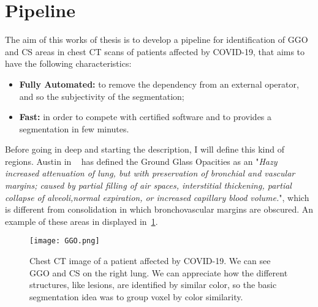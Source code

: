 
	
	\section{Pipeline}
	
	
	
	The aim of this works of thesis is to develop a pipeline for identification of GGO and CS areas in chest CT scans of patients affected by COVID-19, that aims to have the following characteristics:   
	\begin{itemize}
		\item  \textbf{Fully Automated: } to remove the dependency from an external operator, and so the subjectivity of the segmentation; 
		
		\item \textbf{Fast: } in order to compete with certified software and to provides a segmentation in few minutes.
	\end{itemize}

	Before going in deep and starting the description, I will define this kind of regions. 	
	Austin in ~\cite{ART:Austin} has defined the Ground Glass Opacities as an "\emph{Hazy increased attenuation of lung, but with preservation of bronchial and vascular margins; caused by partial filling of air spaces, interstitial thickening, partial collapse of alveoli,normal expiration, or increased capillary blood volume.}", which is different from consolidation in which bronchovascular margins are obscured. An example of these areas in displayed in \figurename\,\ref{fig:GGO}.

	
	
	\begin{figure}[h!]
		\centering
			\texttt{[image: GGO.png]}
		\caption{Chest CT image of a patient affected by COVID-19. We can see GGO and CS on the right lung. We can appreciate how the different structures, like lesions, are identified by similar color, so the basic segmentation idea was to group voxel by color similarity.}
	\label{fig:GGO}
	\end{figure}

